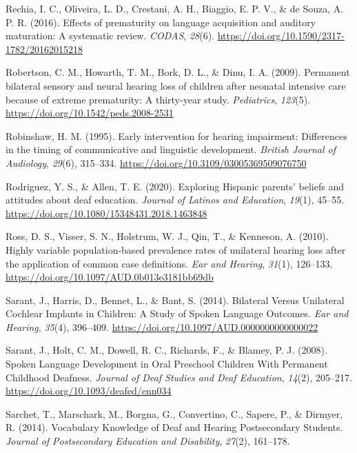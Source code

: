 \documentclass[english,man]{apa6}
\begin{document}
\leavevmode\hypertarget{ref-rechia2016}{}%
Rechia, I. C., Oliveira, L. D., Crestani, A. H., Biaggio, E. P. V., \& de Souza, A. P. R. (2016). Effects of prematurity on language acquisition and auditory maturation: A systematic review. \emph{CODAS}, \emph{28}(6). \url{https://doi.org/10.1590/2317-1782/20162015218}

\leavevmode\hypertarget{ref-robertson2009}{}%
Robertson, C. M., Howarth, T. M., Bork, D. L., \& Dinu, I. A. (2009). Permanent bilateral sensory and neural hearing loss of children after neonatal intensive care because of extreme prematurity: A thirty-year study. \emph{Pediatrics}, \emph{123}(5). \url{https://doi.org/10.1542/peds.2008-2531}

\leavevmode\hypertarget{ref-robinshaw1995}{}%
Robinshaw, H. M. (1995). Early intervention for hearing impairment: Differences in the timing of communicative and linguistic development. \emph{British Journal of Audiology}, \emph{29}(6), 315--334. \url{https://doi.org/10.3109/03005369509076750}

\leavevmode\hypertarget{ref-rodriguez2020}{}%
Rodriguez, Y. S., \& Allen, T. E. (2020). Exploring Hispanic parents' beliefs and attitudes about deaf education. \emph{Journal of Latinos and Education}, \emph{19}(1), 45--55. \url{https://doi.org/10.1080/15348431.2018.1463848}

\leavevmode\hypertarget{ref-ross2010}{}%
Ross, D. S., Visser, S. N., Holstrum, W. J., Qin, T., \& Kenneson, A. (2010). Highly variable population-based prevalence rates of unilateral hearing loss after the application of common case definitions. \emph{Ear and Hearing}, \emph{31}(1), 126--133. \url{https://doi.org/10.1097/AUD.0b013e3181bb69db}

\leavevmode\hypertarget{ref-sarant2014}{}%
Sarant, J., Harris, D., Bennet, L., \& Bant, S. (2014). Bilateral Versus Unilateral Cochlear Implants in Children: A Study of Spoken Language Outcomes. \emph{Ear and Hearing}, \emph{35}(4), 396--409. \url{https://doi.org/10.1097/AUD.0000000000000022}

\leavevmode\hypertarget{ref-sarant2008}{}%
Sarant, J., Holt, C. M., Dowell, R. C., Richards, F., \& Blamey, P. J. (2008). Spoken Language Development in Oral Preschool Children With Permanent Childhood Deafness. \emph{Journal of Deaf Studies and Deaf Education}, \emph{14}(2), 205--217. \url{https://doi.org/10.1093/deafed/enn034}

\leavevmode\hypertarget{ref-sarchet2014}{}%
Sarchet, T., Marschark, M., Borgna, G., Convertino, C., Sapere, P., \& Dirmyer, R. (2014). Vocabulary Knowledge of Deaf and Hearing Postsecondary Students. \emph{Journal of Postsecondary Education and Disability}, \emph{27}(2), 161--178.
\end{document}
